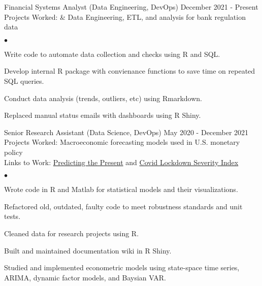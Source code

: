 \documentclass[margin,line]{res}
\newenvironment{list2}{
  \begin{list}{$\bullet$}{%
      \setlength{\itemsep}{0in}
      \setlength{\parsep}{0in} \setlength{\parskip}{0in}
      \setlength{\topsep}{0in} \setlength{\partopsep}{0in} 
      \setlength{\leftmargin}{\dimexpr 26pt-0.05in}}}{\end{list}}
\begin{document}
\begin{resume}
\vspace{-.65cm}

Financial Systems Analyst (Data Engineering, DevOps) \hfill December 2021 - Present\\
\hspace*{3mm}
    Projects Worked:  & Data Engineering, ETL, and analysis for bank regulation data
    \hspace{5cm}
    \begin{list2}
        \item Write code to automate data collection and checks using R and SQL.
        \item Develop internal R package with convienance functions to save time on repeated SQL queries.
        \item Conduct data analysis (trends, outliers, etc) using Rmarkdown.
        \item Replaced manual status emails with dashboards using R Shiny.
    \end{list2}


Senior Research Assistant (Data Science, DevOps) \hfill May 2020 - December 2021
\\
\hspace*{3mm}
    Projects Worked: Macroeconomic forecasting models used in U.S. monetary policy\\
\hspace*{3mm}
    Links to Work:  \href{https://michaelboerman.medium.com/predicting-the-present-a56ff704af0b}{Predicting the Present} and   \href{https://github.com/michaelboerman/lockdown_severity_index#readme}{Covid Lockdown Severity Index}
    
    \begin{list2}
        \item Wrote code in R and Matlab for statistical models and their visualizations.
        \item Refactored old, outdated, faulty code to meet robustness standards and unit tests.
        \item Cleaned data for research projects using R.
        \item Built and maintained documentation wiki in R Shiny.
        \item Studied and implemented econometric models using state-space time series, ARIMA, dynamic factor models, and Baysian VAR.
\end{list2}



\vspace{-.05cm}

\end{resume}
\end{document}
